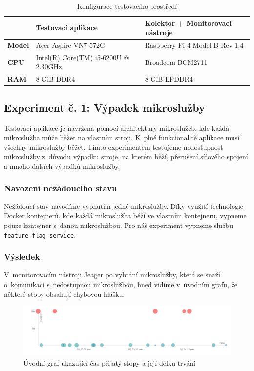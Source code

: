 \begin{table}[H]
\begin{tabular}{|l|l|l|}
\hline
               & \textbf{Testovací aplikace}  & \textbf{Kolektor + Monitorovací nástroje} \\ \hline
\textbf{Model} & Acer Aspire VN7-572G & Raspberry Pi 4 Model B Rev 1.4 \\ \hline
\textbf{CPU}   & Intel(R) Core(TM) i5-6200U @ 2.30GHz & Broadcom BCM2711 \\ \hline
\textbf{RAM}   & 8 GiB DDR4 & 8 GiB LPDDR4  \\ \hline
\end{tabular}
\caption{Konfigurace testovacího prostředí}
\label{tab:konf}
\end{table}

\subsection{Experiment č. 1: Výpadek mikroslužby}

Testovací aplikace je navržena pomocí architektury mikroslužeb, kde každá mikroslužba může běžet na vlastním stroji. K~plné funkcionalitě aplikace musí všechny mikroslužby běžet. Tímto experimentem testujeme nedostupnost mikroslužby z~důvodu výpadku stroje, na kterém běží, přerušení síťového spojení a mnoho dalších výpadků mikroslužby.

\subsubsection{Navození nežádoucího stavu}

Nežádoucí stav navodíme vypnutím jedné mikroslužby. Díky využití technologie Docker kontejnerů, kde každá mikroslužba běží ve vlastním kontejneru, vypneme pouze kontejner s~danou mikroslužbou. Pro náš experiment vypneme službu \texttt{feature-flag-service}.

\subsubsection{Výsledek}

V~monitorovacím nástroji Jeager po vybrání mikroslužby, která se snaží o~komunikaci s~nedostupnou mikroslužbou, hned vidíme v~úvodním grafu, že některé stopy obsahují chybovou hlášku.

\begin{figure}[H]
  \centering
  \includegraphics[width=15cm]{obrazky-figures/jeagerGraf.png}
  \caption{Úvodní graf ukazující čas přijatý stopy a její délku trvání}
  \label{fig:jeagerGraf}
\end{figure}

